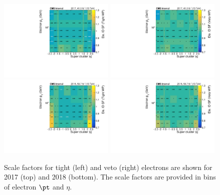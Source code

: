 \begin{figure}[ht!]
  \begin{center}
    \includegraphics[width=0.49\textwidth]{fig/efficiency/lepton/ele_eff_tight_id_2017.pdf}
    \includegraphics[width=0.49\textwidth]{fig/efficiency/lepton/ele_eff_loose_id_2017.pdf}\\
    \includegraphics[width=0.49\textwidth]{fig/efficiency/lepton/ele_eff_tight_id_2018.pdf}
    \includegraphics[width=0.49\textwidth]{fig/efficiency/lepton/ele_eff_loose_id_2018.pdf}
    \caption{
      Scale factors for tight (left) and veto (right) electrons are shown for 2017 (top) and
      2018 (bottom). The scale factors are provided in bins of electron $\pt$ and $\eta$.
    }
    \label{fig:sf_electron_id}
  \end{center}
\end{figure}

